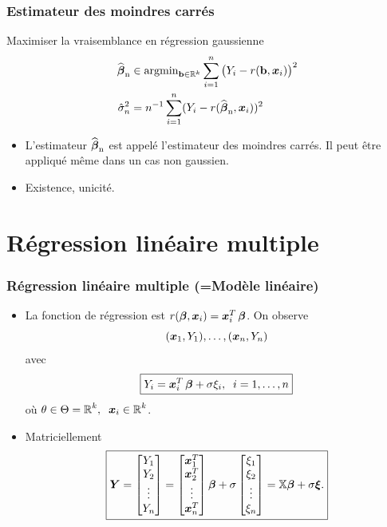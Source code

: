 \begin{frame}
\frametitle{Estimateur des moindres carrés}
Maximiser la \alert{ vraisemblance} en régression gaussienne
\begin{align*}
\operatorname{\widehat{\boldsymbol{\beta}}_n} &\in \mathrm{argmin}_{\mathbf{b} \in \mathbb{R}^k} \sum_{i = 1}^n \big(Y_i-r(\mathbf{b},\operatorname{\boldsymbol{x}}_i)\big)^2 \\
\hat{\sigma}_n^2 &= n^{-1} \sum_{i=1}^n (Y_i - r(\operatorname{\widehat{\boldsymbol{\beta}}_n},\operatorname{\boldsymbol{x}}_i))^2
\end{align*}
\begin{itemize}
\item  L'estimateur $\operatorname{\widehat{\boldsymbol{\beta}}_n}$ est appelé l'\alert{estimateur des moindres carrés}. Il peut être appliqué même dans un cas non gaussien.
\item \alert{ Existence, unicité.}
\end{itemize}
\end{frame}


\section{Régression linéaire multiple}

\begin{frame}
\frametitle{Régression linéaire multiple (=Modèle linéaire)}
\begin{itemize}
\item La fonction de régression est $r(\boldsymbol{\beta},\operatorname{\boldsymbol{x}}_i) = \operatorname{\boldsymbol{x}}_i^T \boldsymbol{\beta}$.
On observe
$$(\operatorname{\boldsymbol{x}}_1,Y_1),\ldots, (\operatorname{\boldsymbol{x}}_n,Y_n)$$
avec
$$\boxed{Y_i = \operatorname{\boldsymbol{x}}_i^T \boldsymbol{\beta}+ \sigma \xi_i,\;\;i=1,\ldots, n}$$
où $\theta \in \Theta = \operatorname{{\mathbb R}}^k,\;\;\operatorname{\boldsymbol{x}}_i \in \operatorname{{\mathbb R}}^k$.
\item \alert{Matriciellement}
$$\boxed{\operatorname{\boldsymbol{Y}} = 
\left[
\begin{matrix}
  Y_1 \\
  Y_2 \\
  \vdots \\
  Y_n
\end{matrix}
\right]
= 
\left[
\begin{matrix}
 \operatorname{\boldsymbol{x}}_1^T \\
 \operatorname{\boldsymbol{x}}_2^T \\
 \vdots  \\
 \operatorname{\boldsymbol{x}}_n^T
\end{matrix}
\right]
\boldsymbol{\beta} +
\sigma 
\left[
\begin{matrix}
 \xi_1 \\
 \xi_2 \\
 \vdots  \\
 \xi_n
\end{matrix}
\right]
=\mathbb{X} \boldsymbol{\beta} + \sigma \boldsymbol{\xi}.}
$$
\end{itemize}
\end{frame}

